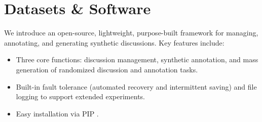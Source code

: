 \section{Datasets \& Software}
\label{sec:data-soft}

We introduce \syndisco\syndiscolink an open-source, lightweight, purpose-built framework for managing, annotating, and generating synthetic discussions. Key features include: 
\begin{itemize}[nosep, noitemsep]
    \item  Three core functions: discussion management, synthetic annotation, and mass generation of randomized discussion and annotation tasks.
    \item  Built-in fault tolerance (automated recovery and intermittent saving) and file logging to support extended experiments.
    \item Easy installation via PIP \pip.
\end{itemize}     
